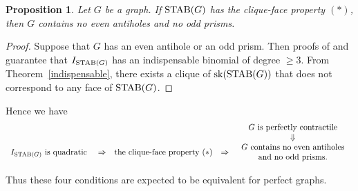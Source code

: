 \documentclass[12pt]{amsart}
\newtheorem{prop}[thm]{Proposition}
\theoremstyle{definition}
\numberwithin{thm}{section}
\numberwithin{equation}{section}
\begin{document}
\begin{prop}
    Let $G$ be a graph.
    If ${\rm STAB}(G)$ has the clique-face property \((*)\), then $G$ contains no even antiholes and no odd prisms.


\end{prop}

\begin{proof}
Suppose that $G$ has an even antihole or an odd prism.
Then proofs of \cite[Theorem 1.7]{OST} and \cite[Proposition 11]{MOS}
guarantee that $I_{{\rm STAB}(G)}$ has an indispensable binomial of degree $\ge 3$. 
From Theorem~\ref{indispensable},  there exists a clique of ${\rm sk}({\rm STAB}(G))$ 
that does not correspond to any face of ${\rm STAB}(G)$.    
\end{proof}

    
Hence we have
\[
\begin{array}{ccccc}
     &   &  &  & G \mbox{ is perfectly contractile}
\\     &   &  &  & \Downarrow
\\
I_{{\rm STAB}(G)} \mbox{ is quadratic }     &  \Rightarrow &
\mbox{the clique-face property } (*) &\Rightarrow &
\begin{array}{c} G \mbox{ contains no even antiholes}\\
 \mbox{and no odd prisms}.
 \end{array}
\end{array}
\]

\smallskip

\noindent
Thus these four conditions are expected to be equivalent for perfect graphs.
\end{document}
